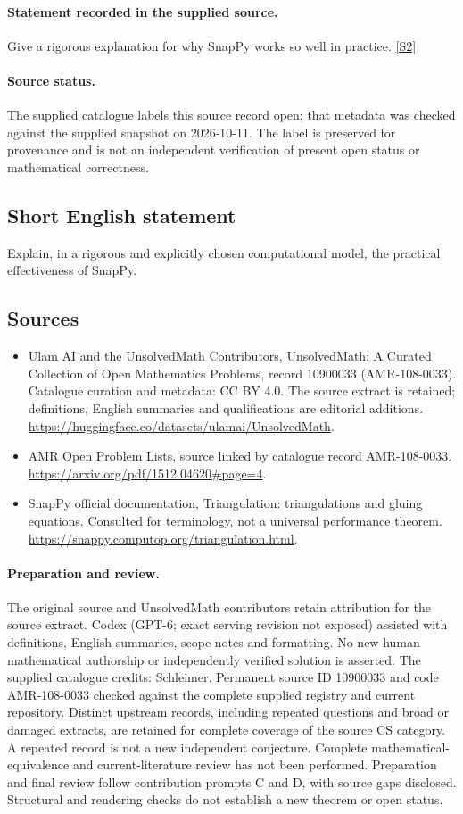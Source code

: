 \documentclass[11pt]{article}
\begin{document}
\paragraph{Statement recorded in the supplied source.}
Give a rigorous explanation for why SnapPy works so well in practice. \href{https://arxiv.org/pdf/1512.04620#page=4}{[S2]}
\paragraph{Source status.}
The supplied catalogue labels this source record open; that metadata was checked against the supplied snapshot on 2026-10-11. The label is preserved for provenance and is not an independent verification of present open status or mathematical correctness.
\subsection{Short English statement}
Explain, in a rigorous and explicitly chosen computational model, the practical effectiveness of SnapPy.
\subsection{Sources}
\begin{itemize}
\item[S1] Ulam AI and the UnsolvedMath Contributors, UnsolvedMath: A Curated Collection of Open Mathematics Problems, record 10900033 (AMR-108-0033). Catalogue curation and metadata: CC BY 4.0. The source extract is retained; definitions, English summaries and qualifications are editorial additions.
\url{https://huggingface.co/datasets/ulamai/UnsolvedMath}.
\item[S2] AMR Open Problem Lists, source linked by catalogue record AMR-108-0033.
\url{https://arxiv.org/pdf/1512.04620#page=4}.
\item[S3] SnapPy official documentation, Triangulation: triangulations and gluing equations. Consulted for terminology, not a universal performance theorem.
\url{https://snappy.computop.org/triangulation.html}.
\end{itemize}
\paragraph{Preparation and review.}
The original source and UnsolvedMath contributors retain attribution for the source extract. Codex (GPT-6; exact serving revision not exposed) assisted with definitions, English summaries, scope notes and formatting. No new human mathematical authorship or independently verified solution is asserted. The supplied catalogue credits: Schleimer. Permanent source ID 10900033 and code AMR-108-0033 checked against the complete supplied registry and current repository. Distinct upstream records, including repeated questions and broad or damaged extracts, are retained for complete coverage of the source CS category. A repeated record is not a new independent conjecture. Complete mathematical-equivalence and current-literature review has not been performed. Preparation and final review follow contribution prompts C and D, with source gaps disclosed. Structural and rendering checks do not establish a new theorem or open status.
\label{end:10900033}
\end{document}
